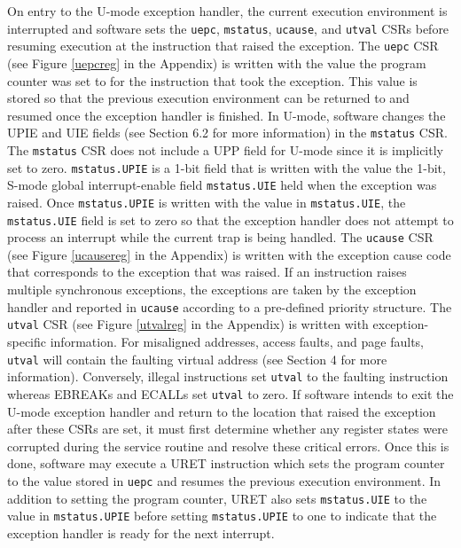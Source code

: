 \documentclass[12pt]{article}
\begin{document}
On entry to the U-mode exception handler, the current execution environment is interrupted and software sets the {\tt{uepc}}, {\tt{mstatus}}, {\tt{ucause}}, and {\tt{utval}} CSRs before resuming execution at the instruction that raised the exception. The {\tt{uepc}} CSR (see Figure \ref{uepcreg} in the Appendix) is written with the value the program counter was set to for the instruction that took the exception. This value is stored so that the previous execution environment can be returned to and resumed once the exception handler is finished. In U-mode, software changes the UPIE and UIE fields (see Section 6.2 for more information) in the {\tt{mstatus}} CSR. The {\tt{mstatus}} CSR does not include a UPP field for U-mode since it is implicitly set to zero. {\tt{mstatus.UPIE}} is a 1-bit field that is written with the value the 1-bit, S-mode global interrupt-enable field {\tt{mstatus.UIE}} held when the exception was raised. Once {\tt{mstatus.UPIE}} is written with the value in {\tt{mstatus.UIE}}, the {\tt{mstatus.UIE}} field is set to zero so that the exception handler does not attempt to process an interrupt while the current trap is being handled. The {\tt{ucause}} CSR (see Figure \ref{ucausereg} in the Appendix) is written with the exception cause code that corresponds to the exception that was raised. If an instruction raises multiple synchronous exceptions, the exceptions are taken by the exception handler and reported in {\tt{ucause}} according to a pre-defined priority structure. The {\tt{utval}} CSR (see Figure \ref{utvalreg} in the Appendix) is written with exception-specific information. For misaligned addresses, access faults, and page faults, {\tt{utval}} will contain the faulting virtual address (see Section 4 for more information). Conversely, illegal instructions set {\tt{utval}} to the faulting instruction whereas EBREAKs and ECALLs set {\tt{utval}} to zero. If software intends to exit the U-mode exception handler and return to the location that raised the exception after these CSRs are set, it must first determine whether any register states were corrupted during the service routine and resolve these critical errors. Once this is done, software may execute a URET instruction which sets the program counter to the value stored in {\tt{uepc}} and resumes the previous execution environment. In addition to setting the program counter, URET also sets {\tt{mstatus.UIE}} to the value in {\tt{mstatus.UPIE}} before setting {\tt{mstatus.UPIE}} to one to indicate that the exception handler is ready for the next interrupt. 
\end{document}
